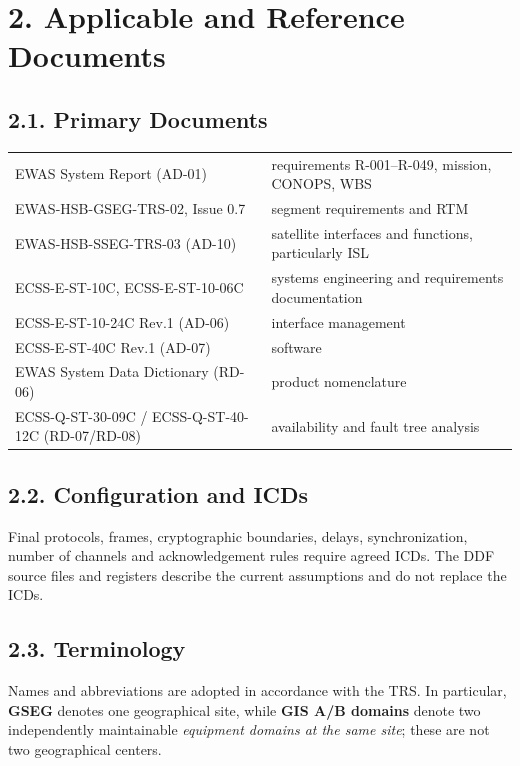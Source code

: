 \section{2. Applicable and Reference Documents}\label{applicable-and-reference-documents}

\subsection{2.1. Primary Documents}\label{primary-documents}

\begingroup{}
\begin{longtable}{|P{0.43}|P{0.57}|}
\hline{}
 & \\ \hline
\endhead
\hline\endlastfoot
EWAS System Report (AD-01) & requirements R-001–R-049, mission, CONOPS, WBS\\ \hline
EWAS-HSB-GSEG-TRS-02, Issue 0.7 & segment requirements and RTM\\ \hline
EWAS-HSB-SSEG-TRS-03 (AD-10) & satellite interfaces and functions, particularly ISL\\ \hline
ECSS-E-ST-10C, ECSS-E-ST-10-06C & systems engineering and requirements documentation\\ \hline
ECSS-E-ST-10-24C Rev.1 (AD-06) & interface management\\ \hline
ECSS-E-ST-40C Rev.1 (AD-07) & software\\ \hline
EWAS System Data Dictionary (RD-06) & product nomenclature\\ \hline
ECSS-Q-ST-30-09C /\allowbreak{} ECSS-Q-ST-40-12C (RD-07/\allowbreak{}RD-08) & availability and fault tree analysis\\*
\end{longtable}
\endgroup

\subsection{2.2. Configuration and ICDs}\label{configuration-and-interface-documentation}

Final protocols, frames, cryptographic boundaries, delays, synchronization, number of channels and acknowledgement rules require agreed ICDs. The DDF source files and registers describe the current assumptions and do not replace the ICDs.

\subsection{2.3. Terminology}\label{terminology}

Names and abbreviations are adopted in accordance with the TRS. In particular, \textbf{GSEG} denotes one geographical site, while \textbf{GIS A/\allowbreak{}B domains} denote two independently maintainable \emph{equipment domains at the same site}; these are not two geographical centers.
